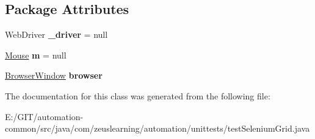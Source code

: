 \subsection*{Package Attributes}
\begin{DoxyCompactItemize}
\item 
\hypertarget{classcom_1_1zeuslearning_1_1automation_1_1unittests_1_1testSeleniumGrid_a1fc1cffed99b063f71f5b1dfa8978860}{}\label{classcom_1_1zeuslearning_1_1automation_1_1unittests_1_1testSeleniumGrid_a1fc1cffed99b063f71f5b1dfa8978860} 
Web\+Driver {\bfseries \+\_\+driver} = null
\item 
\hypertarget{classcom_1_1zeuslearning_1_1automation_1_1unittests_1_1testSeleniumGrid_ad86757e14ce39e8bad4d62a1db9ea014}{}\label{classcom_1_1zeuslearning_1_1automation_1_1unittests_1_1testSeleniumGrid_ad86757e14ce39e8bad4d62a1db9ea014} 
\hyperlink{classcom_1_1zeuslearning_1_1automation_1_1selenium_1_1interactions_1_1Mouse}{Mouse} {\bfseries m} = null
\item 
\hypertarget{classcom_1_1zeuslearning_1_1automation_1_1unittests_1_1testSeleniumGrid_aea1386c7e5077a7e38a99c0ee87479c6}{}\label{classcom_1_1zeuslearning_1_1automation_1_1unittests_1_1testSeleniumGrid_aea1386c7e5077a7e38a99c0ee87479c6} 
\hyperlink{classcom_1_1zeuslearning_1_1automation_1_1selenium_1_1interactions_1_1BrowserWindow}{Browser\+Window} {\bfseries browser}
\end{DoxyCompactItemize}


The documentation for this class was generated from the following file\+:\begin{DoxyCompactItemize}
\item 
E\+:/\+G\+I\+T/automation-\/common/src/java/com/zeuslearning/automation/unittests/test\+Selenium\+Grid.\+java\end{DoxyCompactItemize}
